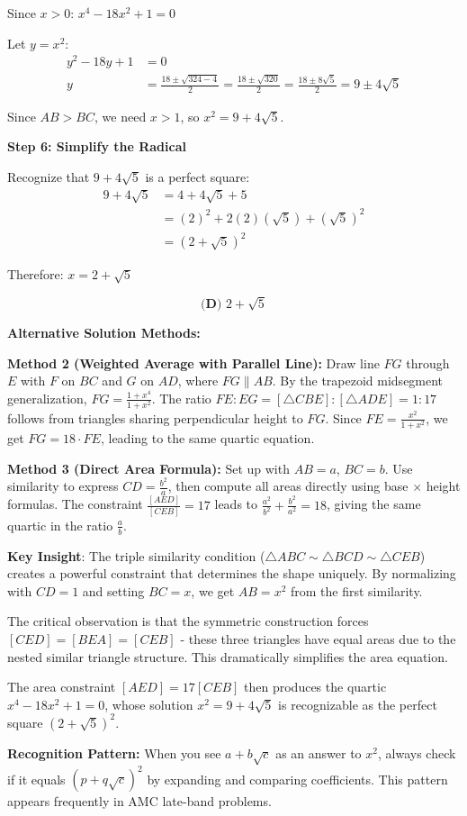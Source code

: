 \documentclass[]{article}
\begin{document}
\begin{solutionbox}
Since $x > 0$: $x^4 - 18x^2 + 1 = 0$

Let $y = x^2$:
\begin{align*}
    y^2 - 18y + 1 &= 0 \\
    y &= \frac{18 \pm \sqrt{324 - 4}}{2} = \frac{18 \pm \sqrt{320}}{2} = \frac{18 \pm 8\sqrt{5}}{2} = 9 \pm 4\sqrt{5}
\end{align*}

Since $AB > BC$, we need $x > 1$, so $x^2 = 9 + 4\sqrt{5}$.

\textbf{Step 6: Simplify the Radical}

Recognize that $9 + 4\sqrt{5}$ is a perfect square:
\begin{align*}
9 + 4\sqrt{5} &= 4 + 4\sqrt{5} + 5 \\
&= (2)^2 + 2(2)(\sqrt{5}) + (\sqrt{5})^2 \\
&= (2 + \sqrt{5})^2
\end{align*}

Therefore: $x = 2 + \sqrt{5}$

\[\boxed{\textbf{(D) } 2 + \sqrt{5}}\]

\textbf{Alternative Solution Methods:}

\textbf{Method 2 (Weighted Average with Parallel Line):} Draw line $FG$ through $E$ with $F$ on $BC$ and $G$ on $AD$, where $FG \parallel AB$. By the trapezoid midsegment generalization, $FG = \frac{1+x^4}{1+x^2}$. The ratio $FE:EG = [\triangle CBE]:[\triangle ADE] = 1:17$ follows from triangles sharing perpendicular height to $FG$. Since $FE = \frac{x^2}{1+x^2}$, we get $FG = 18 \cdot FE$, leading to the same quartic equation.

\textbf{Method 3 (Direct Area Formula):} Set up with $AB = a$, $BC = b$. Use similarity to express $CD = \frac{b^2}{a}$, then compute all areas directly using base $\times$ height formulas. The constraint $\frac{[AED]}{[CEB]} = 17$ leads to $\frac{a^2}{b^2} + \frac{b^2}{a^2} = 18$, giving the same quartic in the ratio $\frac{a}{b}$.
\end{solutionbox}

\begin{keyinsightbox}
\textbf{Key Insight}: The triple similarity condition ($\triangle ABC \sim \triangle BCD \sim \triangle CEB$) creates a powerful constraint that determines the shape uniquely. By normalizing with $CD = 1$ and setting $BC = x$, we get $AB = x^2$ from the first similarity. 

The critical observation is that the symmetric construction forces $[CED] = [BEA] = [CEB]$ - these three triangles have equal areas due to the nested similar triangle structure. This dramatically simplifies the area equation.

The area constraint $[AED] = 17[CEB]$ then produces the quartic $x^4 - 18x^2 + 1 = 0$, whose solution $x^2 = 9 + 4\sqrt{5}$ is recognizable as the perfect square $(2 + \sqrt{5})^2$.

\textbf{Recognition Pattern:} When you see $a + b\sqrt{c}$ as an answer to $x^2$, always check if it equals $(p + q\sqrt{c})^2$ by expanding and comparing coefficients. This pattern appears frequently in AMC late-band problems.
\end{keyinsightbox}
\end{document}
